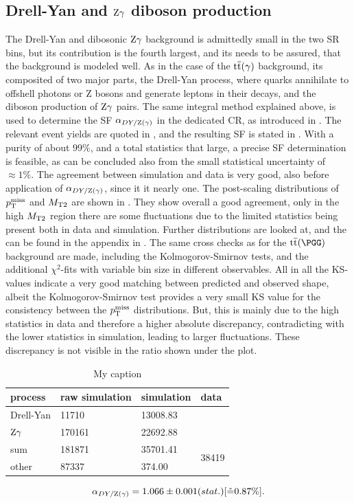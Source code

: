 \subsection{Drell-Yan and $\mathrm{Z}\gamma$ diboson production}
The Drell-Yan and dibosonic $\mathrm{Z}\gamma$ background is admittedly small in the two SR bins, but its contribution is the fourth largest, and its needs to be assured, that the background is modeled well. As in the case of the ${\mathrm{t}\overline{\mathrm{t}}}(\gamma)$ background, its composited of two major parts, the Drell-Yan process, where quarks annihilate to offshell photons or Z bosons and generate leptons in their decays, and the diboson production of $\mathrm{Z}\gamma$ pairs. The same integral method explained above, is used to determine the SF $\alpha_{DY/\mathrm{Z}(\gamma)}$ in the dedicated CR, as introduced in . The relevant event yields are quoted in , and the resulting SF is stated in . With a purity of about $99\%$, and a total statistics that large, a precise SF determination is feasible, as can be concluded also from the small statistical uncertainty of $\approx1\%$. The agreement between simulation and data is very good, also before application of $\alpha_{DY/\mathrm{Z}(\gamma)}$, since it it nearly one. The post-scaling distributions of $p_{\mathrm{T}}^\text{miss}$ and $M_{\mathrm{T2}}$ are shown in . They show overall a good agreement, only in the high $M_{\mathrm{T2}}$ region there are some fluctuations due to the limited statistics being present both in data and simulation. Further distributions are looked at, and the can be found in the appendix in . The same cross checks as for the $\ttbar(\PGG)$ background are made, including the Kolmogorov-Smirnov tests, and the additional $\chi^2$-fits with variable bin size in different observables.
All in all the KS-values indicate a very good matching between predicted and observed shape, albeit the Kolmogorov-Smirnov test provides a very small KS value for the consistency between the $p_{\mathrm{T}}^\text{miss}$ distributions. But, this is mainly due to the high statistics in data and therefore a higher absolute discrepancy, contradicting with the lower statistics in simulation, leading to larger fluctuations. These discrepancy is not visible in the ratio shown under the plot.\\
\begin{table}[htb]
 \centering
 \caption{My caption}
 \label{tab:CRDY}
 \begin{tabular}{llll}
  
  process   & raw simulation & simulation & data                   \\\hline
  Drell-Yan & 11710          & 13008.83   &                        \\
  $\mathrm{Z}\gamma$ & 170161         & 22692.88   &                        \\\hline\hline
  sum       & 181871         & 35701.41   & \multirow{2}{*}{38419} \\
  other     & 87337          & 374.00     &                        
 \end{tabular}
\end{table}
\begin{equation}\label{eq:AlphaDY}
 \alpha_{DY/\mathrm{Z}(\gamma)}=1.066 \pm 0.001 (stat.) [\hat{=}0.87\%].
\end{equation}

